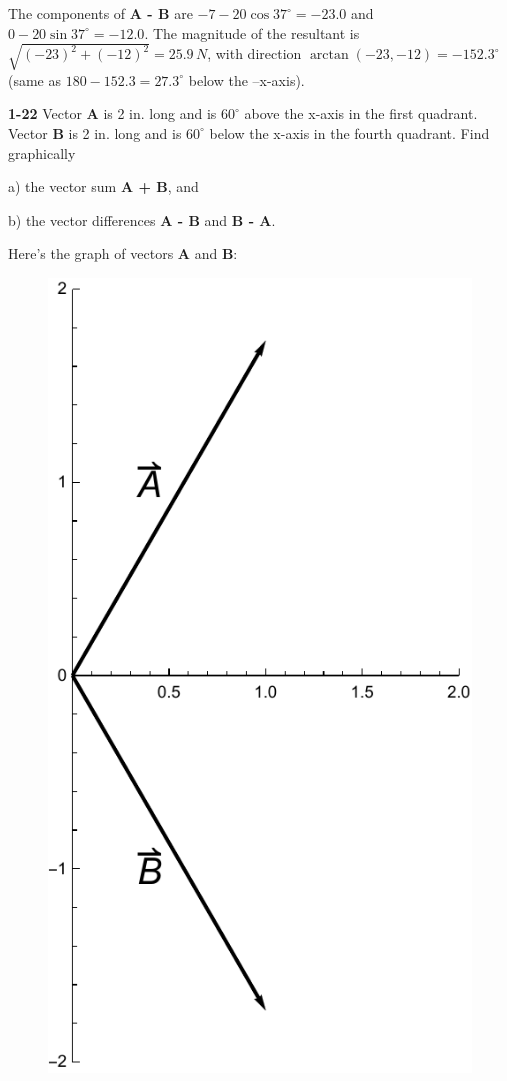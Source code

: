 \documentclass{amsart}
\begin{document}
The components of \textbf{A - B} are $-7 - 20 \cos 37^\circ = -23.0$ and $0 - 20 \sin 37^\circ = -12.0$.
The magnitude of the resultant is $\sqrt{(-23)^2 + (-12)^2} = 25.9\,N$, with direction $\arctan(-23, -12) = -152.3^\circ$
(same as $180 - 152.3 = 27.3^\circ$ below the --x-axis).

\textbf{1-22} Vector \textbf{A} is 2 in. long and is $60^\circ$ above the x-axis in the first quadrant.
Vector \textbf{B} is 2 in. long and is $60^\circ$ below the x-axis in the fourth quadrant.
Find graphically

a) the vector sum \textbf{A + B}, and

b) the vector differences \textbf{A - B} and \textbf{B - A}.

Here's the graph of vectors \textbf{A} and \textbf{B}:

\begin{figure}[h]
\includegraphics[scale=0.32]{1-22a}
\end{figure}
\end{document}
